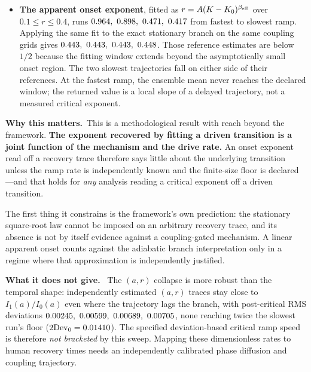 \documentclass[11pt]{article}
\newcommand{\scope}{\par\smallskip\noindent\textbf{What it does not give.}\ }
\begin{document}
\begin{itemize}[leftmargin=*,noitemsep]
($\rampNDelayOne$, $\rampNDelayTwo$, $\rampNDelayThree$ at $N=500$, $2000$,
$8000$). However, dividing the delays by $\sqrt{\log N}$ does not give a
common constant. At the smallest size, fluctuations can already meet the
absolute escape criterion near threshold. The size trend does not establish
the proposed scaling law.
\item \textbf{The apparent onset exponent}, fitted as
$r=A(K-K_0)^{\beta_{\rm eff}}$ over $0.1\le r\le0.4$, runs
$\rampOnsetOne,\ \rampOnsetTwo,\ \rampOnsetThree,\ \rampOnsetFour$ from
fastest to slowest ramp. Applying the same fit to the exact stationary branch
on the same coupling grids gives
$\rampOnsetReferenceOne,\ \rampOnsetReferenceTwo,\
\rampOnsetReferenceThree,\ \rampOnsetReferenceFour$.
Those reference estimates are below $1/2$ because the fitting window extends
beyond the asymptotically small onset region. The two slowest trajectories fall
on either side of their references. At the fastest ramp, the ensemble mean
never reaches the declared window; the returned value is a local slope of a
delayed trajectory, not a measured critical exponent.
\end{itemize}

\par\smallskip\noindent\textbf{Why this matters.}\ 
This is a methodological result with reach beyond the framework. \textbf{The
exponent recovered by fitting a driven transition is a joint function of the
mechanism and the drive rate.} An onset exponent read off a recovery trace
therefore says little about the underlying transition unless the ramp rate is
independently known and the finite-size floor is declared---and that holds for
\emph{any} analysis reading a critical exponent off a driven transition.

The first thing it constrains is the framework's own prediction: the stationary
square-root law cannot be imposed on an arbitrary recovery trace, and its
absence is not by itself evidence against a coupling-gated mechanism. A linear
apparent onset counts against the adiabatic branch interpretation only in a
regime where that approximation is independently justified.

\scope
The $(a,r)$ collapse is more robust than the temporal shape: independently
estimated $(a,r)$ traces stay close to $I_1(a)/I_0(a)$ even where the
trajectory lags the branch, with post-critical RMS deviations
$\rampCollapseOne,\ \rampCollapseTwo,\ \rampCollapseThree,\ \rampCollapseFour$,
none reaching twice the slowest run's floor
($2\mathrm{Dev}_0=0.01410$). The specified deviation-based
critical ramp speed is therefore \emph{not bracketed} by this sweep. Mapping
these dimensionless rates to human recovery times needs an independently
calibrated phase diffusion and coupling trajectory.
\end{document}
